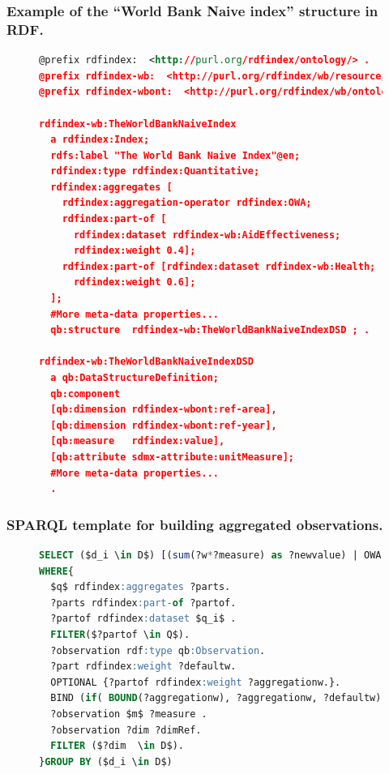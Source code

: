 \documentclass[xcolor=dvipsnames,dvip,notes=show,table]{beamer}
\begin{document}
\begin{frame}[fragile]
\frametitle{Example of the ``World Bank Naive index'' structure in RDF.}
\begin{figure}[!ht]
\begin{lstlisting}[language=XML,basicstyle=\tiny]  
@prefix rdfindex:  <http://purl.org/rdfindex/ontology/> .
@prefix rdfindex-wb:  <http://purl.org/rdfindex/wb/resource/> .
@prefix rdfindex-wbont:  <http://purl.org/rdfindex/wb/ontology/> .

rdfindex-wb:TheWorldBankNaiveIndex 
  a rdfindex:Index;
  rdfs:label "The World Bank Naive Index"@en;
  rdfindex:type rdfindex:Quantitative;
  rdfindex:aggregates [ 		
    rdfindex:aggregation-operator rdfindex:OWA;
    rdfindex:part-of [
      rdfindex:dataset rdfindex-wb:AidEffectiveness; 
      rdfindex:weight 0.4];
    rdfindex:part-of [rdfindex:dataset rdfindex-wb:Health; 
      rdfindex:weight 0.6];
  ];
  #More meta-data properties...
  qb:structure 	rdfindex-wb:TheWorldBankNaiveIndexDSD ; .
  
rdfindex-wb:TheWorldBankNaiveIndexDSD 
  a qb:DataStructureDefinition;  
  qb:component    
  [qb:dimension rdfindex-wbont:ref-area],
  [qb:dimension rdfindex-wbont:ref-year],
  [qb:measure   rdfindex:value],
  [qb:attribute sdmx-attribute:unitMeasure];
  #More meta-data properties...
  .
\end{lstlisting}
 \label{fig:results-rdf-index}
\end{figure}
\end{frame}


\begin{frame}[fragile]
\frametitle{SPARQL template for building aggregated observations.}
\begin{figure}[!ht]
\begin{lstlisting}[language=SQL,basicstyle=\scriptsize,mathescape]  
SELECT ($d_i \in D$) [(sum(?w*?measure) as ?newvalue) | OWA(?measure)]
WHERE{
  $q$ rdfindex:aggregates ?parts.
  ?parts rdfindex:part-of ?partof.
  ?partof rdfindex:dataset $q_i$ .
  FILTER($?partof \in Q$).  
  ?observation rdf:type qb:Observation.
  ?part rdfindex:weight ?defaultw.     
  OPTIONAL {?partof rdfindex:weight ?aggregationw.}.
  BIND (if( BOUND(?aggregationw), ?aggregationw, ?defaultw) AS ?w)
  ?observation $m$ ?measure . 
  ?observation ?dim ?dimRef. 
  FILTER ($?dim  \in D$).
}GROUP BY ($d_i \in D$)
\end{lstlisting}
 \label{fig:results-rdf-sparql-template}
\end{figure}
\end{frame}
\end{document}
